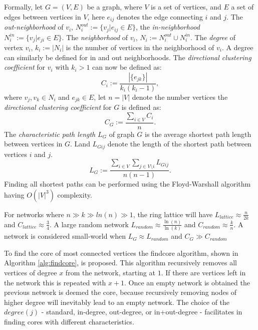Formally, let $G=(V, E)$ be a graph, where $V$ is a set of vertices, and $E$ a set of edges between vertices in $V$, here $e_{ij}$ denotes the edge connecting $i$ and $j$.  The \textit{out-neighborhood} of $v_i$, $N_i^{out}:=\{v_j|e_{ij}\in E\}$, the \textit{in-neighborhood} $N_i^{in}:=\{v_j|e_{ji}\in E\}$. The \textit{neighborhood} of $v_i$, $N_i:=N_i^{out}\cup N_i^{in}$. The \textit{degree} of vertex $v_i$, $k_i:=|N_i|$ is the number of vertices in the neighborhood of $v_i$. A degree can similarly be defined for in and out neighborhoods. The \textit{directional clustering coefficient} for $v_i$ with $k_i>1$ can now be defined as:
\begin{equation}
C_i :=\frac{|\{e_{jk}\}|}{k_i(k_i-1)},
\end{equation}
where $v_j,v_k\in N_i$ and $e_{jk}\in E$, let $n=|V|$ denote the number vertices the \textit{directional clustering coefficient} for $G$ is defined as:
\begin{equation}
C_G:=\frac{\sum_{i\in V} C_i}{n}.
\end{equation}
The \textit{characteristic path length} $L_G$ of graph $G$ is the average shortest path length between vertices in $G$. Land  $L_{Gij}$ denote the length of the shortest path between vertices $i$ and $j$. 
\begin{equation}
L_G:= \frac{\sum_{i\in V} \sum_{j \in V\setminus i}L_{Gij}}{n(n-1)}.
\end{equation}
Finding all shortest paths can be performed using the Floyd-Warshall algorithm~\cite{Floyd} having $O(|V|^3)$ complexity.

For networks where $n\gg k\gg ln(n) \gg1$, the ring lattice will have $L_{lattice}\approx\frac{n}{2k}$ and $C_{lattice}\approx\frac{3}{4}$.
A large random network  $ L_{random}\approx\frac{\ln(n)}{\ln(k)}$ and $C_{random}\approx\frac{k}{n}$. A network is considered small-world when $L_G\approx L_{random}$ and $C_G \gg C_{random}$

To find the core of most connected vertices the findcore algorithm, shown in Algorithm \ref{alg:findcore}, is proposed. This algorithm recursively removes all vertices of degree $x$ from the network, starting at $1$. If there are vertices left in the network this is repeated with  $x+1$. Once an empty network is obtained the previous network is deemed the core, because recursively removing nodes of higher degree will inevitably lead to an empty network. The choice of the $degree(j)$ - standard, in-degree, out-degree,  or in+out-degree - facilitates in finding cores with different characteristics.

